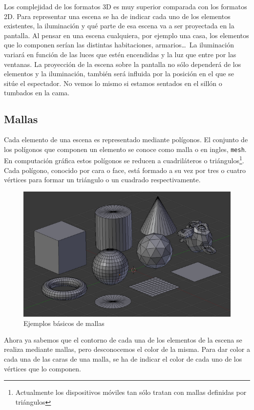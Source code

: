 Los complejidad de los formatos 3D es muy superior comparada con los formatos 2D. Para representar una escena se ha de indicar cada uno de los elementos existentes, la iluminación y qué parte de esa escena va a ser proyectada en la pantalla. Al pensar en una escena cualquiera, por ejemplo una casa, los elementos que lo componen serían las distintas habitaciones, armarios\ldots\ La iluminación variará en función de las luces que estén encendidas y la luz que entre por las ventanas. La proyección de la escena sobre la pantalla no sólo dependerá de los elementos y la iluminación, también será influida por la posición en el que se sitúe el espectador. No vemos lo mismo si estamos sentados en el sillón o tumbados en la cama.

\subsection{Mallas}

Cada elemento de una escena es representado mediante polígonos. El conjunto de los polígonos que componen un elemento se conoce como malla o en ingles, \texttt{mesh}. En computación gráfica estos polígonos se reducen a cuadriláteros o triángulos\footnote{Actualmente los dispositivos móviles tan sólo tratan con mallas definidas por triángulos}. Cada polígono, conocido por cara o face, está formado a su vez  por tres o cuatro vértices para formar un triángulo o un cuadrado respectivamente.

\begin{figure}[h]
	\centering
	\includegraphics[width=12cm]{img/mallas.png}
	\caption{Ejemplos básicos de mallas}
\end{figure}

Ahora ya sabemos que el contorno de cada una de los elementos de la escena se realiza mediante mallas, pero desconocemos el color de la misma. Para dar color a cada una de las caras de una malla, se ha de indicar el color de cada uno de los vértices que lo componen. 



